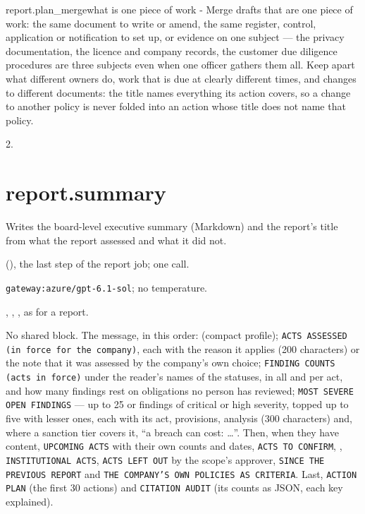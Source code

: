 \par\nopagebreak
\begin{promptexcerpt}{report.plan_merge}{what is one piece of work}
- Merge drafts that are one piece of work: the same document to write or amend, the
  same register, control, application or notification to set up, or evidence on one
  subject — the privacy documentation, the licence and company records, the customer
  due diligence procedures are three subjects even when one officer gathers them
  all. Keep apart what different owners do, work that is due at clearly different
  times, and changes to different documents: the title names everything its action
  covers, so a change to another policy is never folded into an action whose title
  does not name that policy.
\end{promptexcerpt}

 2.


\section{report.summary}\label{sec:aprompts:report-summary}

 Writes the board-level executive summary (Markdown) and the report's
title from what the report assessed and what it did not.

  (), the last step of
the report job; one call.

 \texttt{gateway:azure/gpt-6.1-sol}; no temperature.

 , , , as for a
report.

 No shared block. The message, in this order:
 (compact profile); \texttt{ACTS ASSESSED (in force for the company)}, each with the
reason it applies (200 characters) or the note that it was assessed by the company's own
choice; \texttt{FINDING COUNTS (acts in force)} under the reader's names of the statuses, in all
and per act, and how many findings rest on obligations no person has reviewed;
\texttt{MOST SEVERE OPEN FINDINGS} --- up to 25  or  findings of
critical or high severity, topped up to five with lesser ones, each with its act, provisions,
analysis (300 characters) and, where a sanction tier covers it, \enquote{a breach can cost:
…}. Then, when they have content, \texttt{UPCOMING ACTS} with their own counts and dates,
\texttt{ACTS TO CONFIRM}, , \texttt{INSTITUTIONAL ACTS}, \texttt{ACTS LEFT OUT} by
the scope's approver, \texttt{SINCE THE PREVIOUS REPORT} and \texttt{THE COMPANY'S OWN POLICIES AS CRITERIA}. Last, \texttt{ACTION PLAN} (the first 30 actions) and \texttt{CITATION AUDIT} (its
counts as JSON, each key explained).

